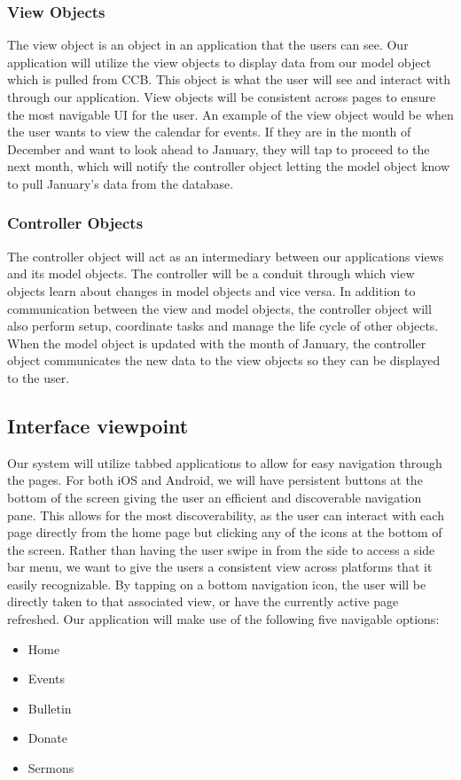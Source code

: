 \documentclass[letterpaper,10pt,draftclsnofoot,onecolumn,titlepage]{IEEEtran}
\begin{document}
			\subsubsection{View Objects}
				The view object is an object in an application that the users can see.
				Our application will utilize the view objects to display data from our model object which is pulled from CCB.
				This object is what the user will see and interact with through our application.
				View objects will be consistent across pages to ensure the most navigable UI for the user.
				An example of the view object would be when the user wants to view the calendar for events.
				If they are in the month of December and want to look ahead to January, they will tap to proceed to the next month, which will notify the controller object letting the model object know to pull January's data from the database.

			\subsubsection{Controller Objects}
				The controller object will act as an intermediary between our applications views and its model objects.
				The controller will be a conduit through which view objects learn about changes in model objects and vice versa.
				In addition to communication between the view and model objects, the controller object will also perform setup, coordinate tasks and manage the life cycle of other objects.
				When the model object is updated with the month of January, the controller object communicates the new data to the view objects so they can be displayed to the user.


		\subsection{Interface viewpoint}
			Our system will utilize tabbed applications to allow for easy navigation through the pages.
			For both iOS and Android, we will have persistent buttons at the bottom of the screen giving the user an efficient and discoverable navigation pane.
			This allows for the most discoverability, as the user can interact with each page directly from the home page but clicking any of the icons at the bottom of the screen.
			Rather than having the user swipe in from the side to access a side bar menu, we want to give the users a consistent view across platforms that it easily recognizable.
			By tapping on a bottom navigation icon, the user will be directly taken to that associated view, or have the currently active page refreshed.
			Our application will make use of the following five navigable options:
			\begin{itemize}
				\item Home
				\item Events
				\item Bulletin
				\item Donate
				\item Sermons
			\end{itemize}
\end{document}

